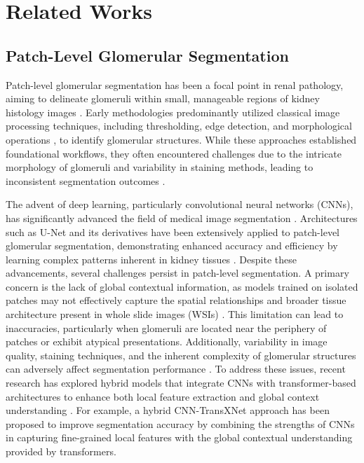 \section{Related Works}
\subsection{Patch-Level Glomerular Segmentation}
    
Patch-level glomerular segmentation has been a focal point in renal pathology, aiming to delineate glomeruli within small, manageable regions of kidney histology images \citep{ginley2019computational}. Early methodologies predominantly utilized classical image processing techniques, including thresholding, edge detection, and morphological operations \citep{electronics9030503, ginley2017automatic}, to identify glomerular structures. While these approaches established foundational workflows, they often encountered challenges due to the intricate morphology of glomeruli and variability in staining methods, leading to inconsistent segmentation outcomes \citep{electronics9030503}.

The advent of deep learning, particularly convolutional neural networks (CNNs), has significantly advanced the field of medical image segmentation \citep{GALLEGO2021101865}. Architectures such as U-Net and its derivatives have been extensively applied to patch-level glomerular segmentation, demonstrating enhanced accuracy and efficiency by learning complex patterns inherent in kidney tissues \citep{Samant2023Glomerulus, GALLEGO2021101865, deng2023omni}.
Despite these advancements, several challenges persist in patch-level segmentation. A primary concern is the lack of global contextual information, as models trained on isolated patches may not effectively capture the spatial relationships and broader tissue architecture present in whole slide images (WSIs) \citep{Wu2023DigitalPathology}. This limitation can lead to inaccuracies, particularly when glomeruli are located near the periphery of patches or exhibit atypical presentations. Additionally, variability in image quality, staining techniques, and the inherent complexity of glomerular structures can adversely affect segmentation performance \citep{Wu2023DigitalPathology}. 
To address these issues, recent research has explored hybrid models that integrate CNNs with transformer-based architectures to enhance both local feature extraction and global context understanding \citep{Liu2024, Yin2024, Wu2023DigitalPathology, deng2024prpseg, deng2024hats, deng2023segment, cuienhancing}. For example, a hybrid CNN-TransXNet \citep{Liu2024} approach has been proposed to improve segmentation accuracy by combining the strengths of CNNs in capturing fine-grained local features with the global contextual understanding provided by transformers.


